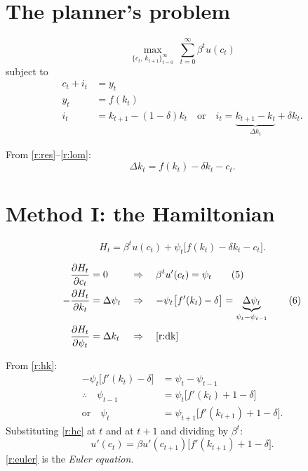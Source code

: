 \documentclass[11pt]{article}
\begin{document}


\section{The planner's problem}

\[ \max_{\{c_t,\,k_{t+1}\}_{t=0}^{\infty}} \ \sum_{t=0}^{\infty}\beta^t u(c_t) \]
subject to
\begin{align}
  c_t+i_t &= y_t \tag{1}\label{r:res}\\
  y_t &= f(k_t) \tag{2}\label{r:tech}\\
  i_t &= k_{t+1}-(1-\delta)k_t
  \quad\text{or}\quad
  i_t=\underbrace{k_{t+1}-k_t}_{\Delta k_t}+\delta k_t . \tag{3}\label{r:lom}
\end{align}

From \eqref{r:res}--\eqref{r:lom}:
\begin{equation}
  \Delta k_t = f(k_t)-\delta k_t-c_t . \tag{4}\label{r:dk}
\end{equation}


\section{Method I: the Hamiltonian}

\[ H_t=\beta^t u(c_t)+\psi_t\bigl[f(k_t)-\delta k_t-c_t\bigr]. \]

\begin{align}
  \frac{\partial H_t}{\partial c_t}&=0
     &&\Rightarrow\quad \beta^t u'(c_t)=\psi_t \tag{5}\label{r:hc}\\
  -\frac{\partial H_t}{\partial k_t}&=\Delta\psi_t
     &&\Rightarrow\quad -\psi_t\bigl[f'(k_t)-\delta\bigr]
       =\underbrace{\Delta\psi_t}_{\psi_t-\psi_{t-1}} \tag{6}\label{r:hk}\\
  \frac{\partial H_t}{\partial \psi_t}&=\Delta k_t
     &&\Rightarrow\quad \text{\eqref{r:dk}} \notag
\end{align}

From \eqref{r:hk}:
\begin{align*}
  -\psi_t\bigl[f'(k_t)-\delta\bigr]&=\psi_t-\psi_{t-1}\\
  \therefore\quad \psi_{t-1}&=\psi_t\bigl[f'(k_t)+1-\delta\bigr]\\
  \text{or}\quad \psi_t&=\psi_{t+1}\bigl[f'(k_{t+1})+1-\delta\bigr].
\end{align*}
Substituting \eqref{r:hc} at $t$ and at $t+1$ and dividing by $\beta^t$:
\begin{equation}
  u'(c_t)=\beta u'(c_{t+1})\bigl[f'(k_{t+1})+1-\delta\bigr]. \tag{7}\label{r:euler}
\end{equation}
\eqref{r:euler} is the \emph{Euler equation}.
\end{document}
